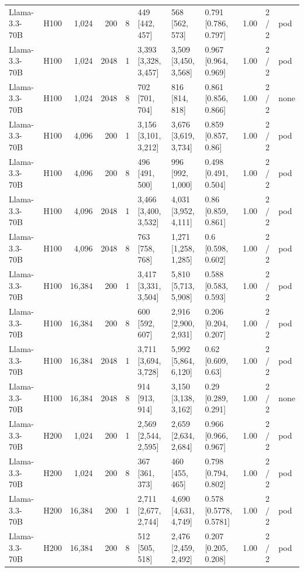 \begin{landscape}
\begin{longtable}{llrrrlllrll}
Llama-3.3-70B & H100 & 1,024 & 200 & 8 & 449 {[}442, 457{]} & 568 {[}562, 573{]} & 0.791 {[}0.786, 0.797{]} & 1.00 & 2 / 2 & pod \\
Llama-3.3-70B & H100 & 1,024 & 2048 & 1 & 3,393 {[}3,328, 3,457{]} & 3,509 {[}3,450, 3,568{]} & 0.967 {[}0.964, 0.969{]} & 1.00 & 2 / 2 & pod \\
Llama-3.3-70B & H100 & 1,024 & 2048 & 8 & 702 {[}701, 704{]} & 816 {[}814, 818{]} & 0.861 {[}0.856, 0.866{]} & 1.00 & 2 / 2 & none \\
Llama-3.3-70B & H100 & 4,096 & 200 & 1 & 3,156 {[}3,101, 3,212{]} & 3,676 {[}3,619, 3,734{]} & 0.859 {[}0.857, 0.86{]} & 1.00 & 2 / 2 & pod \\
Llama-3.3-70B & H100 & 4,096 & 200 & 8 & 496 {[}491, 500{]} & 996 {[}992, 1,000{]} & 0.498 {[}0.491, 0.504{]} & 1.00 & 2 / 2 & pod \\
Llama-3.3-70B & H100 & 4,096 & 2048 & 1 & 3,466 {[}3,400, 3,532{]} & 4,031 {[}3,952, 4,111{]} & 0.86 {[}0.859, 0.861{]} & 1.00 & 2 / 2 & pod \\
Llama-3.3-70B & H100 & 4,096 & 2048 & 8 & 763 {[}758, 768{]} & 1,271 {[}1,258, 1,285{]} & 0.6 {[}0.598, 0.602{]} & 1.00 & 2 / 2 & pod \\
Llama-3.3-70B & H100 & 16,384 & 200 & 1 & 3,417 {[}3,331, 3,504{]} & 5,810 {[}5,713, 5,908{]} & 0.588 {[}0.583, 0.593{]} & 1.00 & 2 / 2 & pod \\
Llama-3.3-70B & H100 & 16,384 & 200 & 8 & 600 {[}592, 607{]} & 2,916 {[}2,900, 2,931{]} & 0.206 {[}0.204, 0.207{]} & 1.00 & 2 / 2 & pod \\
Llama-3.3-70B & H100 & 16,384 & 2048 & 1 & 3,711 {[}3,694, 3,728{]} & 5,992 {[}5,864, 6,120{]} & 0.62 {[}0.609, 0.63{]} & 1.00 & 2 / 2 & pod \\
Llama-3.3-70B & H100 & 16,384 & 2048 & 8 & 914 {[}913, 914{]} & 3,150 {[}3,138, 3,162{]} & 0.29 {[}0.289, 0.291{]} & 1.00 & 2 / 2 & none \\
Llama-3.3-70B & H200 & 1,024 & 200 & 1 & 2,569 {[}2,544, 2,595{]} & 2,659 {[}2,634, 2,684{]} & 0.966 {[}0.966, 0.967{]} & 1.00 & 2 / 2 & pod \\
Llama-3.3-70B & H200 & 1,024 & 200 & 8 & 367 {[}361, 373{]} & 460 {[}455, 465{]} & 0.798 {[}0.794, 0.802{]} & 1.00 & 2 / 2 & pod \\
Llama-3.3-70B & H200 & 16,384 & 200 & 1 & 2,711 {[}2,677, 2,744{]} & 4,690 {[}4,631, 4,749{]} & 0.578 {[}0.5778, 0.5781{]} & 1.00 & 2 / 2 & pod \\
Llama-3.3-70B & H200 & 16,384 & 200 & 8 & 512 {[}505, 518{]} & 2,476 {[}2,459, 2,492{]} & 0.207 {[}0.205, 0.208{]} & 1.00 & 2 / 2 & pod \\

\end{longtable}
\end{landscape}
